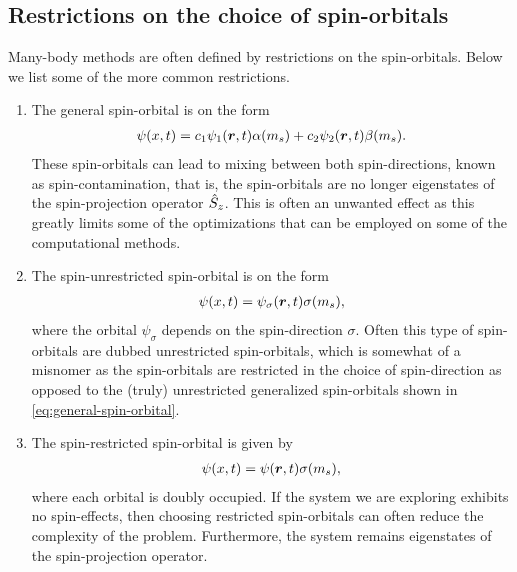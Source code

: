         \subsection{Restrictions on the choice of spin-orbitals}
            \label{subsec:restrictions-on-spin-orbitals}
            Many-body methods are often defined by restrictions on the
            spin-orbitals.
            Below we list some of the more common restrictions.
            \begin{enumerate}
                \item The general spin-orbital is on the form
                    \begin{align}
                        \psi(x, t)
                        = c_1\psi_1(\boldsymbol{r}, t) \alpha(m_s)
                        + c_2\psi_2(\boldsymbol{r}, t) \beta(m_s).
                        \label{eq:general-spin-orbital}
                    \end{align}
                    These spin-orbitals can lead to mixing between both
                    spin-directions, known as spin-contamination, that is, the
                    spin-orbitals are no longer eigenstates of the
                    spin-projection operator $\hat{S}_{z}$.
                    This is often an unwanted effect as this greatly limits some
                    of the optimizations that can be employed on some of the
                    computational methods.
                \item The spin-unrestricted spin-orbital is on the form
                    \begin{align}
                        \psi(x, t)
                        = \psi_{\sigma}(\boldsymbol{r}, t) \sigma(m_s),
                        \label{eq:unrestricted-spin-orbital}
                    \end{align}
                    where the orbital $\psi_{\sigma}$ depends on the
                    spin-direction $\sigma$.
                    Often this type of spin-orbitals are dubbed unrestricted
                    spin-orbitals, which is somewhat of a misnomer as the
                    spin-orbitals are restricted in the choice of spin-direction
                    as opposed to the (truly) unrestricted generalized
                    spin-orbitals shown in \autoref{eq:general-spin-orbital}.
                \item The spin-restricted spin-orbital is given by
                    \begin{align}
                        \psi(x, t)
                        = \psi(\boldsymbol{r}, t) \sigma(m_s),
                        \label{eq:restricted-spin-orbital}
                    \end{align}
                    where each orbital is doubly occupied.
                    If the system we are exploring exhibits no spin-effects,
                    then choosing restricted spin-orbitals can often reduce the
                    complexity of the problem.
                    Furthermore, the system remains eigenstates of the
                    spin-projection operator.
            \end{enumerate}



